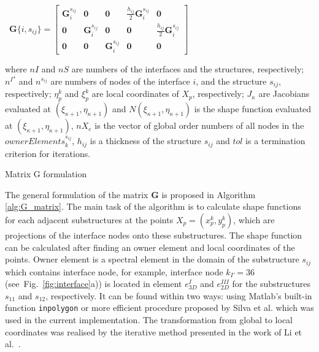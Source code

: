 \documentclass[materials,article,submit,moreauthors,pdftex]{Definitions/mdpi}
\providecommand{\DIFadd}[1]{{\protect\color{blue}{#1}}} %
\providecommand{\DIFdel}[1]{{\protect\color{red}\sout{#1}}}                      %
\providecommand{\DIFaddbegin}{} %
\providecommand{\DIFaddend}{} %
\providecommand{\DIFdelbegin}{} %
\providecommand{\DIFdelend}{} %
\begin{document}
\begin{algorithm}[H]
{{{				%
\mbox{%
\(\mathbf{G}\{i,s_{ij}\}=\left[\begin{array}{ccccc}
				\mathbf{G}^{s_{ij}}_i & \mathbf{0} & \mathbf{0} & 
				\frac{h_{ij}}{2}\mathbf{G}^{s_{ij}}_i & \mathbf{0}\\
				\mathbf{0} & \mathbf{G}^{s_{ij}}_i & \mathbf{0} & \mathbf{0} & 
				\frac{h_{ij}}{2}\mathbf{G}^{s_{ij}}_i\\
				\mathbf{0} & \mathbf{0} & \mathbf{G}^{s_{ij}}_i & \mathbf{0} & 
				\mathbf{0}
				\end{array} \right]
				\)
}%
\;	}

		}
	}
\DIFaddend where \(nI\) and \(nS\) are numbers of the interfaces and the structures, respectively; \(n^{\Gamma^i}\) and \(n^{s_{ij}}\) are numbers of nodes of the interface \(i\), and the structure \(s_{ij}\), respectively; \(\eta^k_p\) and  \(\xi^k_p\) are local coordinates of \(X_p\), respectively; \(J_{\kappa}\) are Jacobians evaluated at \((\xi_{\kappa+1},\eta_{\kappa+1})\) and \(N(\xi_{\kappa+1},\eta_{\kappa+1})\) is the shape function evaluated at \((\xi_{\kappa+1},\eta_{\kappa+1})\), \(nX_e\) is the vector of global order numbers of all nodes in the \DIFdelbegin \DIFdel{\(ownerElements^{s_{ij}}_k\)}\DIFdelend \DIFaddbegin \DIFadd{\(Elements^{s_{ij}}_k\)}\DIFaddend , \(h_{ij}\) is a thickness of the structure \(s_{ij}\) and \(tol\) is a termination criterion for iterations.
	\caption{Matrix G formulation}
	\label{alg:G_matrix}
\end{algorithm}
The general formulation of the matrix \textbf{G} is proposed in Algorithm \ref{alg:G_matrix}.
The main task of the algorithm is to calculate shape functions for each adjacent substructures at the points \(X_p=(x_p^k,y_p^k)\), which are projections of the interface nodes onto these substructures.
The shape function can be calculated after finding an owner element and local coordinates of the points.
Owner element is a spectral element in the domain of the substructure \(s_{ij}\) which contains interface node, for example, interface node \(k_\Gamma=36\) (see~Fig.~\ref{fig:interface}a)) is located in \DIFaddbegin \DIFadd{the }\DIFaddend element \(e^{I}_{3D}\) and \(e^{III}_{2D}\) for the substructures \(s_{11}\) and \(s_{12}\), respectively.
It can be found within two ways: using Matlab's built-in function \verb+inpolygon+ or more efficient procedure proposed by Silva et al. \cite{silva2009exact} which was used in the current implementation.
The transformation from global to local coordinates was realised by the iterative method presented in the work of Li et al.~\cite{li2014efficient}.
\end{document}
